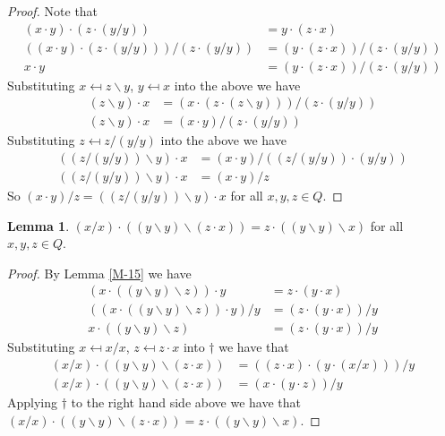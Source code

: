 \documentclass[12pt]{report}
\theoremstyle{definition}
\newtheorem{lem}[thm]{Lemma}
\newcommand{\ldv}{\backslash}       %
\begin{document}
\begin{proof}
  Note that
  \begin{align*}
    (x\cdot y)\cdot (z\cdot(y/y)) &= y\cdot (z\cdot x)\\
    ((x\cdot y)\cdot (z\cdot(y/y)))/(z\cdot(y/y)) &= (y\cdot (z\cdot x))/(z\cdot(y/y))\\
    x\cdot y &= (y\cdot (z\cdot x))/(z\cdot(y/y))
  \end{align*}
  Substituting $x \mapsfrom z\ldv y$, $y \mapsfrom x$ into the above we have
  \begin{align*}
    (z\ldv y)\cdot x &= (x\cdot (z\cdot (z\ldv y)))/(z\cdot(y/y))\\
    (z\ldv y)\cdot x &= (x\cdot y)/(z\cdot(y/y))
  \end{align*}
  Substituting $z \mapsfrom z/(y/y)$ into the above we have
  \begin{align*}
    ((z/(y/y))\ldv y)\cdot x &= (x\cdot y)/((z/(y/y))\cdot (y/y))\\
    ((z/(y/y))\ldv y)\cdot x &= (x\cdot y)/z
  \end{align*}
  So $(x\cdot y)/z = ((z/(y/y))\ldv y)\cdot x$ for all $x, y, z\in Q$.
\end{proof}

\begin{lem}\label{M-30}
  $(x/x)\cdot ((y\ldv y)\ldv (z\cdot x)) = z\cdot((y\ldv y)\ldv x)$ for all $x, y, z\in Q$.
\end{lem}

\begin{proof}
  By Lemma \ref{M-15} we have
  \begin{align*}
    (x\cdot ((y\ldv y)\ldv z))\cdot y &= z\cdot(y\cdot x)\\
    ((x\cdot ((y\ldv y)\ldv z))\cdot y)/y &= (z\cdot(y\cdot x))/y\\
    x\cdot((y\ldv y)\ldv z) &= (z\cdot(y\cdot x))/y \tag{$\dagger$}
  \end{align*}
  Substituting $x \mapsfrom x/x$, $z \mapsfrom z\cdot x$ into $\dagger$ we have that
  \begin{align*}
    (x/x)\cdot ((y\ldv y)\ldv (z\cdot x)) &= ((z\cdot x)\cdot (y\cdot (x/x)))/y\\
    (x/x)\cdot ((y\ldv y)\ldv (z\cdot x)) &= (x\cdot(y\cdot z))/y
  \end{align*}
  Applying $\dagger$ to the right hand side above we have that
    $(x/x)\cdot ((y\ldv y)\ldv (z\cdot x)) = z\cdot((y\ldv y)\ldv x)$.
\end{proof}
\end{document}
